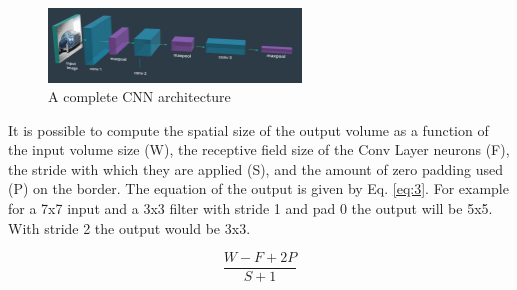 \documentclass{article}
\begin{document}
\begin{figure}[ht]
    \centering
    \includegraphics[width=0.6\textwidth,height=0.6\textheight,keepaspectratio]{images/full_cnn.png}
    \captionsetup{justification=centering}
    \caption{A complete CNN architecture}
    \label{fig:f24}
\end{figure}


It is possible to compute the spatial size of the output volume as a function of the input volume size (W), the receptive field size of the Conv Layer neurons (F), the stride with which they are applied (S), and the amount of zero padding used (P) on the border. The equation of the output is given by Eq. \eqref{eq:3}. For example for a 7x7 input and a 3x3 filter with stride 1 and pad 0 the output will be 5x5. With stride 2 the output would be 3x3.

\begin{equation}
\frac{W - F + 2P} {S + 1}
\label{eq:3}
\end{equation}





\printbibliography
\end{document}

